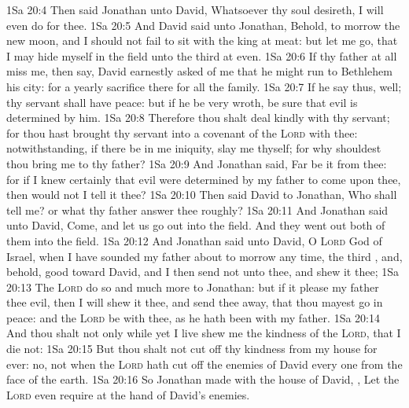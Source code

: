 \vs 1Sa 20:4 Then said Jonathan unto David, Whatsoever thy soul desireth, I will even do  for thee.
\vs 1Sa 20:5 And David said unto Jonathan, Behold, to morrow  the new moon, and I should not fail to sit with the king at meat: but let me go, that I may hide myself in the field unto the third  at even.
\vs 1Sa 20:6 If thy father at all miss me, then say, David earnestly asked  of me that he might run to Bethlehem his city: for  a yearly sacrifice there for all the family.
\vs 1Sa 20:7 If he say thus,  well; thy servant shall have peace: but if he be very wroth,  be sure that evil is determined by him.
\vs 1Sa 20:8 Therefore thou shalt deal kindly with thy servant; for thou hast brought thy servant into a covenant of the \textsc{Lord} with thee: notwithstanding, if there be in me iniquity, slay me thyself; for why shouldest thou bring me to thy father?
\vs 1Sa 20:9 And Jonathan said, Far be it from thee: for if I knew certainly that evil were determined by my father to come upon thee, then would not I tell it thee?
\vs 1Sa 20:10 Then said David to Jonathan, Who shall tell me? or what  thy father answer thee roughly?
\vs 1Sa 20:11 And Jonathan said unto David, Come, and let us go out into the field. And they went out both of them into the field.
\vs 1Sa 20:12 And Jonathan said unto David, O \textsc{Lord} God of Israel, when I have sounded my father about to morrow any time,  the third , and, behold,  good toward David, and I then send not unto thee, and shew it thee;
\vs 1Sa 20:13 The \textsc{Lord} do so and much more to Jonathan: but if it please my father  thee evil, then I will shew it thee, and send thee away, that thou mayest go in peace: and the \textsc{Lord} be with thee, as he hath been with my father.
\vs 1Sa 20:14 And thou shalt not only while yet I live shew me the kindness of the \textsc{Lord}, that I die not:
\vs 1Sa 20:15 But  thou shalt not cut off thy kindness from my house for ever: no, not when the \textsc{Lord} hath cut off the enemies of David every one from the face of the earth.
\vs 1Sa 20:16 So Jonathan made  with the house of David, , Let the \textsc{Lord} even require  at the hand of David's enemies.
